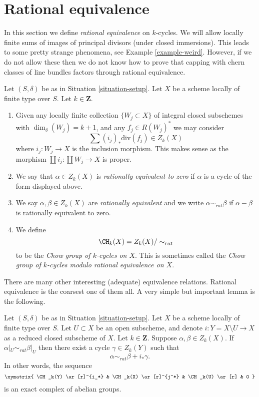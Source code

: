 \section{Rational equivalence}
\label{section-rational-equivalence}

\noindent
In this section we define {\it rational equivalence} on $k$-cycles.
We will allow locally finite sums of images of
principal divisors (under closed immersions). This leads to some
pretty strange phenomena, see Example \ref{example-weird}.
However, if we do not allow these then we do not know how to prove that
capping with chern classes of line bundles factors through rational
equivalence.

\begin{definition}
\label{definition-rational-equivalence}
Let $(S, \delta)$ be as in Situation \ref{situation-setup}.
Let $X$ be a scheme locally of finite type over $S$.
Let $k \in \mathbf{Z}$.
\begin{enumerate}
\item Given any locally finite collection $\{W_j \subset X\}$
of integral closed subschemes with $\dim_\delta(W_j) = k + 1$,
and any $f_j \in R(W_j)^*$ we may consider
$$
\sum (i_j)_*\text{div}(f_j) \in Z_k(X)
$$
where $i_j : W_j \to X$ is the inclusion morphism.
This makes sense as the morphism
$\coprod i_j : \coprod W_j \to X$ is proper.
\item We say that $\alpha \in Z_k(X)$ is {\it rationally equivalent to zero}
if $\alpha$ is a cycle of the form displayed above.
\item We say $\alpha, \beta \in Z_k(X)$ are
{\it rationally equivalent} and we write $\alpha \sim_{rat} \beta$
if $\alpha - \beta$ is rationally equivalent to zero.
\item We define
$$
\CH_k(X) = Z_k(X) / \sim_{rat}
$$
to be the {\it Chow group of $k$-cycles on $X$}. This is sometimes called
the {\it Chow group of $k$-cycles modulo rational equivalence on $X$}.
\end{enumerate}
\end{definition}

\noindent
There are many other interesting (adequate) equivalence relations.
Rational equivalence is the coarsest one of them all.
A very simple but important lemma is the following.

\begin{lemma}
\label{lemma-restrict-to-open}
Let $(S, \delta)$ be as in Situation \ref{situation-setup}.
Let $X$ be a scheme locally of finite type over $S$.
Let $U \subset X$ be an open subscheme, and denote
$i : Y = X \setminus U \to X$ as a reduced closed subscheme of $X$.
Let $k \in \mathbf{Z}$.
Suppose $\alpha, \beta \in Z_k(X)$.
If $\alpha|_U \sim_{rat} \beta|_U$ then there exist a cycle
$\gamma \in Z_k(Y)$ such that
$$
\alpha \sim_{rat} \beta + i_*\gamma.
$$
In other words, the sequence
$$
\xymatrix{
\CH_k(Y) \ar[r]^{i_*} & \CH_k(X) \ar[r]^{j^*} & \CH_k(U) \ar[r] & 0
}
$$
is an exact complex of abelian groups.
\end{lemma}

